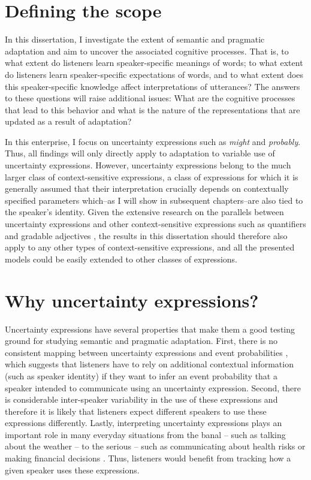 \section{Defining the scope}

In this dissertation, I investigate the extent of semantic and pragmatic adaptation and aim to uncover
the associated cognitive processes. That is, to what extent do listeners learn speaker-specific
meanings of words; to what extent do listeners learn speaker-specific expectations of words,
and to what extent does this speaker-specific knowledge affect interpretations of utterances? 
The answers to these questions will raise additional issues: What are the cognitive processes 
that lead to this behavior and what is the nature of the representations that are updated as a result of 
adaptation?

In this enterprise, I focus on uncertainty expressions
such as \emph{might} and \emph{probably}. Thus, all findings will only directly apply to 
adaptation to variable use of uncertainty expressions. However, uncertainty expressions 
belong to the much larger class of context-sensitive expressions, a class of expressions for 
which it is generally assumed  that their interpretation crucially depends on contextually 
specified parameters which--as I will show in subsequent chapters--are
also tied to the speaker's identity. Given the extensive research on the parallels between
uncertainty expressions and other context-sensitive expressions such as quantifiers and
gradable adjectives \cite{Lassiter2016, Scholler2017}, the results in this dissertation
should therefore also apply to any other types of context-sensitive expressions, and all
the presented models could be easily extended to other classes of expressions. 

\section{Why uncertainty expressions?}
\label{sec:why-uncertainty-expressions}

Uncertainty expressions have several properties that make them a good testing ground for studying semantic and pragmatic
adaptation. First, there is no consistent mapping between uncertainty expressions and event probabilities , 
which suggests that listeners have to rely on additional contextual information (such as speaker identity)
if they want to infer an event probability that a speaker intended to communicate using an uncertainty expression. Second, there is considerable inter-speaker variability 
in the use of these expressions \cite{Wallsten1986} and therefore it is likely that listeners expect different speakers to use these expressions
differently. Lastly, interpreting uncertainty expressions plays an important role in many everyday situations from the banal -- 
such as talking about the weather -- to the serious -- such as communicating about health risks 
\cite{Berry2004, Lipkus2007, Politi2007} or making financial decisions \cite{Doupnik2003}. 
Thus, listeners would benefit from tracking  how a given speaker uses these expressions. 

